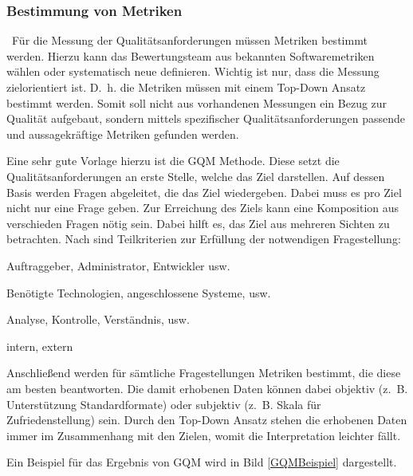 \subsubsection{Bestimmung von Metriken}
\
Für die Messung der Qualitätsanforderungen müssen Metriken bestimmt werden. Hierzu kann das Bewertungsteam aus bekannten Softwaremetriken wählen oder systematisch neue definieren. Wichtig ist nur, dass die Messung zielorientiert ist. D. h. die Metriken müssen mit einem Top-Down Ansatz bestimmt werden\cite{Habenicht2008}. Somit soll nicht aus vorhandenen Messungen ein Bezug zur Qualität aufgebaut, sondern mittels spezifischer Qualitätsanforderungen passende und aussagekräftige Metriken gefunden werden.

Eine sehr gute Vorlage hierzu ist die \ac{GQM} Methode. Diese setzt die Qualitätsanforderungen an erste Stelle, welche das Ziel darstellen. Auf dessen Basis werden Fragen abgeleitet, die das Ziel wiedergeben. Dabei muss es pro Ziel nicht nur eine Frage geben. Zur Erreichung des Ziels kann eine Komposition aus verschieden Fragen nötig sein. Dabei hilft es, das Ziel aus mehreren Sichten zu betrachten. Nach\cite{Habenicht2008}
sind Teilkriterien zur Erfüllung der notwendigen Fragestellung:
 
\begin{description}[leftmargin=!,labelwidth=\widthof{\bfseries Anwendungsbereich}]
	\item[Sichtweise] Auftraggeber, Administrator, Entwickler usw.
	\item[Anwendungsbereich] Benötigte Technologien, angeschlossene Systeme, usw.
	\item[Zweck] Analyse, Kontrolle, Verständnis, usw.
	\item[Kontext] intern, extern
\end{description} 
 
Anschließend werden für sämtliche Fragestellungen Metriken bestimmt, die diese am besten beantworten. Die damit erhobenen Daten können dabei objektiv (z.~B. Unterstützung Standardformate) oder subjektiv (z.~B. Skala für Zufriedenstellung) sein.
Durch den Top-Down Ansatz stehen die erhobenen Daten immer im Zusammenhang mit den Zielen, womit die Interpretation leichter fällt. 

Ein Beispiel für das Ergebnis von \ac{GQM} wird in Bild \ref{GQMBeispiel} dargestellt.

 

